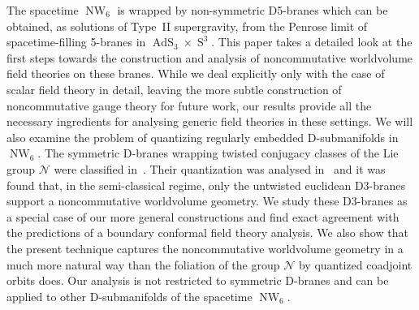 \documentclass[11pt,a4paper]{article}
\DeclareMathOperator{\AdS}{AdS}
\DeclareMathOperator{\Sphere}{S}
\DeclareMathOperator{\NW}{NW}
\let\S\Sphere
\newcommand{\1}{\mathbb{1}}
\begin{document}
The spacetime $\NW_6$ is wrapped by non-symmetric D5-branes which can
be obtained, as solutions of Type~II supergravity, from the Penrose
limit of spacetime-filling 5-branes in $\AdS_3\times\S^3$. This paper
takes a detailed look at the first steps towards the construction and
analysis of noncommutative worldvolume field theories on these
branes. While we deal explicitly only with the case of scalar field
theory in detail, leaving the more subtle construction of
noncommutative gauge theory for future work, our results provide all
the necessary ingredients for analysing generic field theories in
these settings. We will also examine the problem of quantizing
regularly embedded D-submanifolds in $\NW_6$. The symmetric D-branes
wrapping twisted conjugacy classes of the Lie group $\mathcal{N}$ were
classified in~\cite{SF1}. Their quantization was analysed
in~\cite{HSz1} and it was found that, in the semi-classical regime,
only the untwisted euclidean D3-branes support a noncommutative
worldvolume geometry. We study these D3-branes as a special case of
our more general constructions and find exact agreement with the
predictions of a boundary conformal field theory analysis. We also
show that the present technique captures the noncommutative
worldvolume geometry in a much more natural way than the foliation of
the group $\mathcal{N}$ by quantized coadjoint orbits does. Our
analysis is not restricted to symmetric D-branes and can be applied to
other D-submanifolds of the spacetime $\NW_6$.
\end{document}
